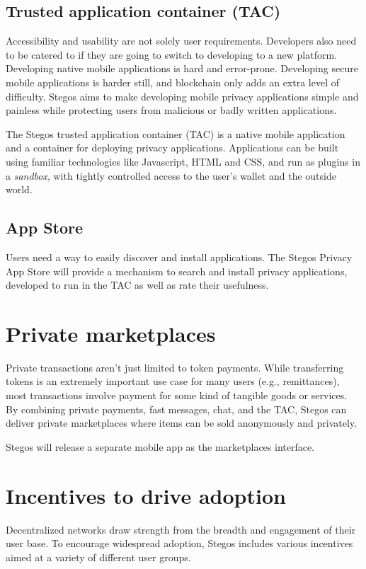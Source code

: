 \documentclass[8pt,fleqn,openany]{book}
\begin{document}
\subsection{Trusted application container (TAC)}
Accessibility and usability are not solely user requirements. Developers also need to be catered to if they are going to switch to developing to a new platform. Developing native mobile applications is hard and error-prone. Developing secure mobile applications is harder still, and blockchain only adds an extra level of difficulty. Stegos aims to make developing mobile privacy applications simple and painless while protecting users from malicious or badly written applications. 

The Stegos trusted application container (TAC) is a native mobile application and a container for deploying privacy applications. Applications can be built using familiar technologies like Javascript, HTML and CSS, and run as plugins in a \textit{sandbox}, with tightly controlled access to the user’s wallet and the outside world.

\subsection{App Store}
 Users need a way to easily discover and install applications. The Stegos Privacy App Store will provide a mechanism to search and install privacy applications, developed to run in the TAC as well as rate their usefulness.  

\section{Private marketplaces}
Private transactions aren’t just limited to token payments. While transferring tokens is an extremely important use case for many users (e.g., remittances), most transactions involve payment for some kind of tangible goods or services. By combining private payments, fast messages, chat, and the TAC, Stegos can deliver private marketplaces where items can be sold anonymously and privately. 

Stegos will release a separate mobile app as the marketplaces interface.  

\section{Incentives to drive adoption}
Decentralized networks draw strength from the breadth and engagement of their user base. To encourage widespread adoption, Stegos includes various incentives aimed at a variety of different user groups. 
\end{document}
